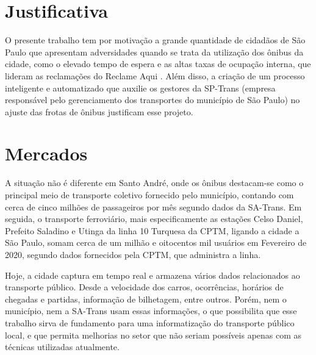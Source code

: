 \section{Justificativa}
\indent
\par O presente trabalho tem por motivação a grande quantidade de cidadãos de São Paulo que apresentam adversidades quando se trata da utilização dos ônibus da cidade, como o elevado tempo de espera e as altas taxas de ocupação interna, que lideram as reclamações do Reclame Aqui \cite{ReclameAqui1} \cite{ReclameAqui2}. Além disso, a criação de um processo inteligente e automatizado que auxilie os gestores da SP-Trans (empresa responsável pelo gerenciamento dos transportes do município de São Paulo) no ajuste das frotas de ônibus justificam esse projeto.

\section{Mercados}
\indent
\par A situação não é diferente em Santo André, onde os ônibus destacam-se como o principal meio de transporte coletivo fornecido pelo município, contando com cerca de cinco milhões de passageiros por mês segundo dados da SA-Trans. Em seguida, o transporte ferroviário, mais especificamente as estações Celso Daniel, Prefeito Saladino e Utinga da linha 10 Turquesa da CPTM, ligando a cidade a São Paulo, somam cerca de um milhão e oitocentos mil usuários em Fevereiro de 2020, segundo dados fornecidos pela CPTM, que administra a linha.
\par Hoje, a cidade captura em tempo real e armazena vários dados relacionados ao transporte público. Desde a velocidade dos carros, ocorrências, horários de chegadas e partidas, informação de bilhetagem, entre outros. Porém, nem o município, nem a SA-Trans usam essas informações, o que possibilita que esse trabalho sirva de fundamento para uma informatização do transporte público local, e que permita melhorias no setor que não seriam possíveis apenas com as técnicas utilizadas atualmente.

